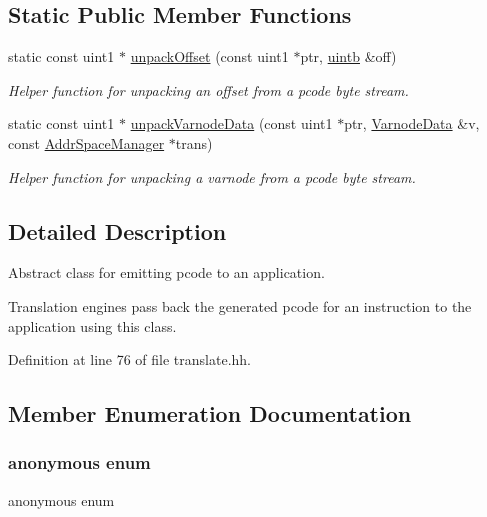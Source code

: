 \subsection*{Static Public Member Functions}
\begin{DoxyCompactItemize}
\item 
static const uint1 $\ast$ \mbox{\hyperlink{class_pcode_emit_a58dbf8967eef54f79f9e622b69df46a5}{unpack\+Offset}} (const uint1 $\ast$ptr, \mbox{\hyperlink{types_8h_a2db313c5d32a12b01d26ac9b3bca178f}{uintb}} \&off)
\begin{DoxyCompactList}\small\item\em Helper function for unpacking an offset from a pcode byte stream. \end{DoxyCompactList}\item 
static const uint1 $\ast$ \mbox{\hyperlink{class_pcode_emit_aa5c98b5fd60bc78f36de44f6fa20dde7}{unpack\+Varnode\+Data}} (const uint1 $\ast$ptr, \mbox{\hyperlink{struct_varnode_data}{Varnode\+Data}} \&v, const \mbox{\hyperlink{class_addr_space_manager}{Addr\+Space\+Manager}} $\ast$trans)
\begin{DoxyCompactList}\small\item\em Helper function for unpacking a varnode from a pcode byte stream. \end{DoxyCompactList}\end{DoxyCompactItemize}


\subsection{Detailed Description}
Abstract class for emitting pcode to an application. 

Translation engines pass back the generated pcode for an instruction to the application using this class. 

Definition at line 76 of file translate.\+hh.



\subsection{Member Enumeration Documentation}
\mbox{\label{class_pcode_emit_a95e8a4cd96ea2cd38102668ac2581482}} 
\subsubsection{\texorpdfstring{anonymous enum}{anonymous enum}}
{\footnotesize\ttfamily anonymous enum}

